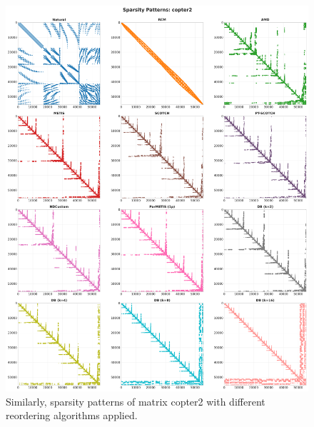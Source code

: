 \begin{figure}[h]
\centering
\includegraphics[width=\textwidth]{fig/res/copter2_sparsity_patterns.png}
\caption{Similarly, sparsity patterns of matrix copter2 with different reordering algorithms applied.}
\label{fig:copter2-sparsity-patterns}
\end{figure}




